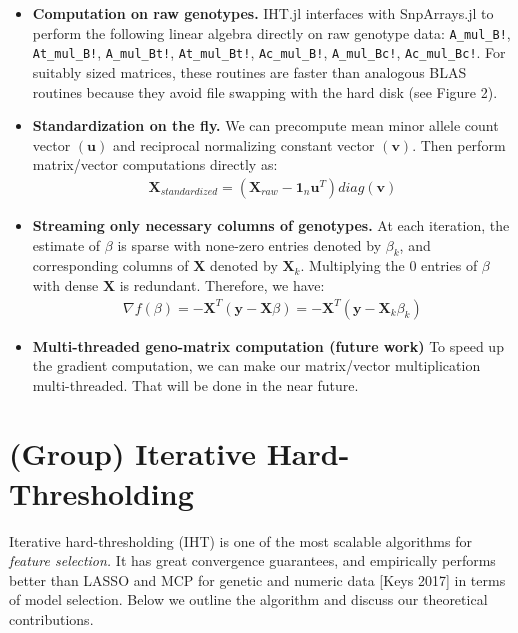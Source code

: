 \documentclass[a0,portrait]{a0poster}
\newcommand{\code}[1]{\colorbox{light-gray}{\texttt{#1}}}
\begin{document}
\begin{multicols}{2}
\color{Black} %
\begin{itemize}
	\item \textbf{Computation on raw genotypes.} IHT.jl interfaces with SnpArrays.jl to perform the following linear algebra directly on raw genotype data: \code{A\_mul\_B!}, \code{At\_mul\_B!}, \code{A\_mul\_Bt!}, \code{At\_mul\_Bt!}, \code{Ac\_mul\_B!}, \code{A\_mul\_Bc!}, \code{Ac\_mul\_Bc!}. For suitably sized matrices, these routines are faster than analogous BLAS routines because they avoid file swapping with the hard disk (see Figure 2).
\item \textbf{Standardization on the fly.} We can precompute mean minor allele count vector $(\mathbf{u})$ and reciprocal normalizing constant vector $(\mathbf{v})$. Then perform matrix/vector computations directly as:
	\begin{align*}
		\mathbf{X}_{standardized} = \left(\mathbf{X}_{raw} - \mathbf{1}_{n} \mathbf{u}^T\right) diag(\mathbf{v})
	\end{align*}
\item \textbf{Streaming only necessary columns of genotypes.} At each iteration, the estimate of $\beta$ is sparse with none-zero entries denoted by $\beta_k$, and corresponding columns of $\mathbf{X}$ denoted by $\mathbf{X}_k$. Multiplying the 0 entries of $\beta$ with dense $\mathbf{X}$ is redundant. Therefore, we have:
	\begin{align*}
		\nabla f(\beta) = -\mathbf{X}^T(\mathbf{y} - \mathbf{X}\beta) = -\mathbf{X}^T(\mathbf{y} - \mathbf{X}_k\beta_k) 
	\end{align*}
    \item \textbf{Multi-threaded geno-matrix computation (future work)} To speed up the gradient computation, we can make our matrix/vector multiplication multi-threaded. That will be done in the near future.
\end{itemize}


\color{Navy} 
\section*{(Group) Iterative Hard-Thresholding}

\color{Black}

Iterative hard-thresholding (IHT) is one of the most scalable algorithms for \textit{feature selection.} It has great convergence guarantees, and empirically performs better than LASSO and MCP for genetic and numeric data [Keys 2017] in terms of model selection. Below we outline the algorithm and discuss our theoretical contributions.


\end{multicols}
\end{document}
